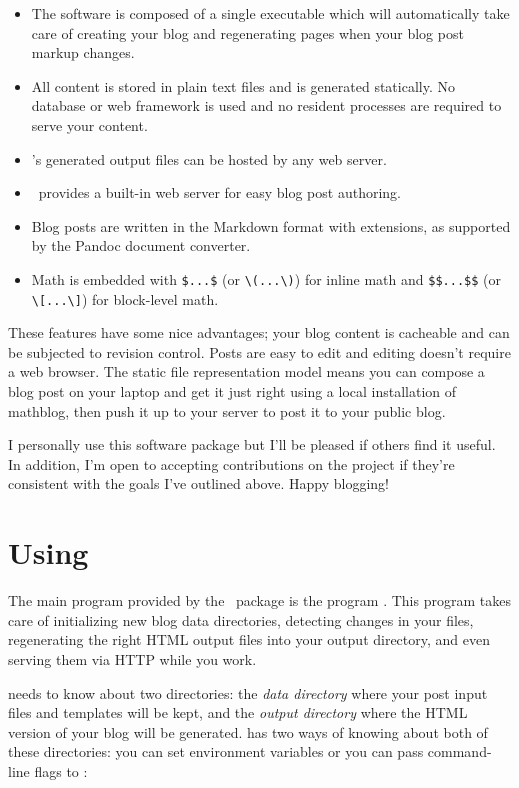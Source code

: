 \documentclass[11pt, letterpaper, oneside, titlepage]{book}
\begin{document}
\begin{itemize}
\item{The software is composed of a single executable which will
  automatically take care of creating your blog and regenerating pages
  when your blog post markup changes.}
\item{All content is stored in plain text files and is generated
  statically.  No database or web framework is used and no resident
  processes are required to serve your content.}
\item{\mathblog's generated output files can be hosted by any web
  server.}
\item{\mathblog\ provides a built-in web server for easy blog post
  authoring.}
\item{Blog posts are written in the Markdown format with extensions,
  as supported by the Pandoc document converter.}
\item{Math is embedded with \verb|$...$| (or \verb|\(...\)|) for inline math
	and \verb|$$...$$| (or \verb|\[...\]|) for block-level math.}
\end{itemize}

These features have some nice advantages; your blog content is
cacheable and can be subjected to revision control.  Posts are easy to
edit and editing doesn't require a web browser.  The static file
representation model means you can compose a blog post on your laptop
and get it just right using a local installation of mathblog, then
push it up to your server to post it to your public blog.

I personally use this software package but I'll be pleased if others
find it useful.  In addition, I'm open to accepting contributions on
the project if they're consistent with the goals I've outlined above.
Happy blogging!

\chapter{Using \mathblog}

The main program provided by the \mathblog\ package is the program
.  This program takes care of initializing new blog data
directories, detecting changes in your files, regenerating the right
HTML output files into your output directory, and even serving them
via HTTP while you work.

 needs to know about two directories: the \textit{data
  directory} where your post input files and templates will be kept,
and the \textit{output directory} where the HTML version of your blog
will be generated.   has two ways of knowing about both of
these directories: you can set environment variables or you can pass
command-line flags to :
\end{document}
